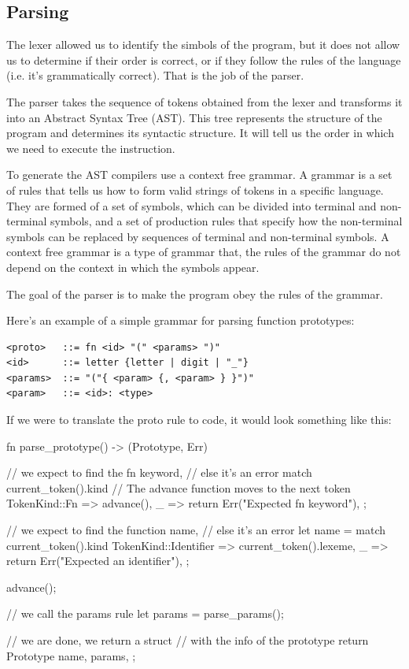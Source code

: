 ﻿\documentclass[10pt,a4paper,twocolumn,twoside]{article}
\begin{document}
\subsection{Parsing}
The lexer allowed us to identify the simbols of the program, but it does not 
allow us to determine if their order is correct, or if they follow the rules of
the language (i.e. it's grammatically correct). That is the job of the parser.

The parser takes the sequence of tokens obtained from the lexer and
transforms it into an Abstract Syntax Tree (AST). This tree represents the
structure of the program and determines its syntactic structure. It will tell us
the order in which we need to execute the instruction.

To generate the AST compilers use a context free grammar. A grammar is a set of
rules that tells us how to form valid strings of tokens in a specific language.
They are formed of a set of symbols, which can be divided into terminal and
non-terminal symbols, and a set of production rules that specify how the
non-terminal symbols can be replaced by sequences of terminal and non-terminal
symbols. A context free grammar is a type of grammar that, the rules of the grammar do
not depend on the context in which the symbols appear.

The goal of the parser is to make the program obey the rules of the grammar.

Here's an example of a simple grammar for parsing function prototypes:

\begin{small}
\begin{verbatim}
<proto>   ::= fn <id> "(" <params> ")"
<id>      ::= letter {letter | digit | "_"}
<params>  ::= "("{ <param> {, <param> } }")"
<param>   ::= <id>: <type>
\end{verbatim}
\end{small}

If we were to translate the proto rule to code, it would look something like 
this:

\begin{code}
fn parse_prototype() -> (Prototype, Err) {
    // we expect to find the fn keyword,
    // else it's an error
    match current_token().kind {
        // The advance function moves to the next token
        TokenKind::Fn => advance(),
        _ => return Err("Expected fn keyword"),
    };

    // we expect to find the function name,
    // else it's an error
    let name = match current_token().kind {
        TokenKind::Identifier => current_token().lexeme,
        _ => return Err("Expected an identifier"),
    };

    advance();

    // we call the params rule
    let params = parse_params();

    // we are done, we return a struct 
    // with the info of the prototype
    return Prototype { 
        name,
        params,
    };
}
\end{code}
\end{document}
